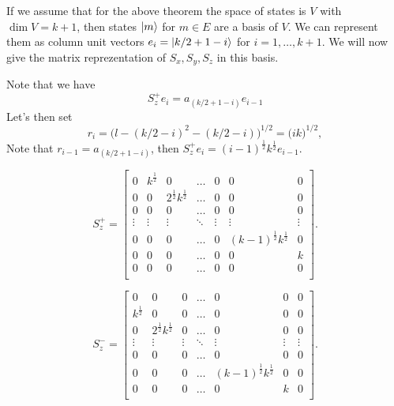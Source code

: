 \documentclass[main.tex]{subfiles}
\begin{document}
If we assume that for the above theorem the space of states is $V$ with $\dim V = k + 1$, then states $\ket{m}$ for $m\in E$ are a basis of $V$. We can represent them as column unit vectors 
$e_i = \ket{k/2 + 1 - i}$ for $i=1, \dots, k + 1$. We will now give the matrix reprezentation of $S_x, S_y, S_z$ in this basis.

Note that we have
\begin{equation}
S^{+}_z e_i = a_{(k/2 + 1 - i)} e_{i - 1}
\end{equation}
Let's then set 
$$r_i = \bigg(l - (k/2 - i)^2 - (k/2 - i)\bigg)^{1/2} = \big(ik\big)^{1/2},$$
Note that $r_{i-1} = a_{(k/2 + 1 - i)}$, then $S^{+}_z e_i = (i - 1)^{\frac{1}{2}} k^{\frac{1}{2}} e_{i - 1}$.

\begin{equation}
S^{+}_z = \begin{bmatrix}
    0 & k^{\frac{1}{2}} & 0 & \dots  & 0 & 0 & 0 \\
    0 & 0 & 2^{\frac{1}{2}}k^{\frac{1}{2}} & \dots & 0 & 0 & 0\\
    0 & 0 & 0 & \dots  & 0 & 0 & 0\\
    \vdots  & \vdots & \vdots  & \ddots & \vdots & \vdots & \vdots\\
    0 & 0 & 0 & \dots  & 0 & (k-1)^{\frac{1}{2}}k^{\frac{1}{2}} & 0 \\
    0 & 0 & 0 & \dots & 0 & 0 & k\\
    0 & 0 & 0 & \dots  & 0 & 0 & 0\\
\end{bmatrix}.
\end{equation}

\begin{equation}
S^{-}_z = \begin{bmatrix}
    0 &  0 & 0 & \dots  & 0 & 0 & 0 \\
    k^{\frac{1}{2}} & 0 & 0 & \dots & 0 & 0 & 0\\
    0 & 2^{\frac{1}{2}}k^{\frac{1}{2}} & 0 & \dots  & 0 & 0 & 0\\
    \vdots  & \vdots & \vdots  & \ddots & \vdots & \vdots & \vdots\\
    0 & 0 & 0 & \dots  & 0 & 0 & 0 \\
    0 & 0 & 0 & \dots & (k-1)^{\frac{1}{2}}k^{\frac{1}{2}} & 0 & 0\\
    0 & 0 & 0 & \dots  & 0 & k & 0\\
\end{bmatrix}.
\end{equation}
\end{document}
